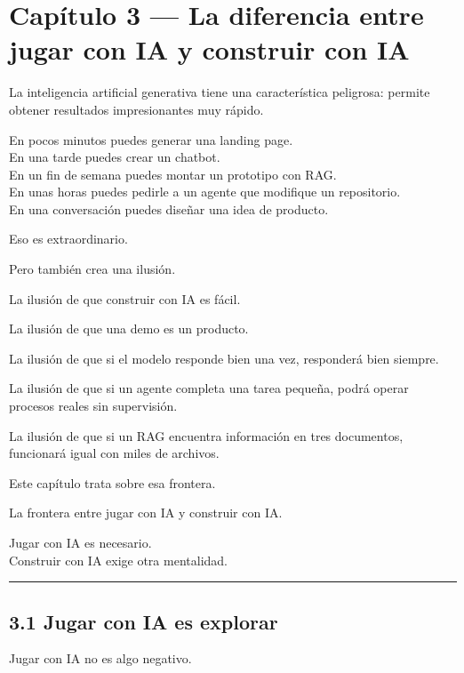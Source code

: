 \newpage

\chapter{Capítulo 3 --- La diferencia entre jugar con IA y construir con
IA}\label{capuxedtulo-3-la-diferencia-entre-jugar-con-ia-y-construir-con-ia}

La inteligencia artificial generativa tiene una característica
peligrosa: permite obtener resultados impresionantes muy rápido.

En pocos minutos puedes generar una landing page.\\
En una tarde puedes crear un chatbot.\\
En un fin de semana puedes montar un prototipo con RAG.\\
En unas horas puedes pedirle a un agente que modifique un repositorio.\\
En una conversación puedes diseñar una idea de producto.

Eso es extraordinario.

Pero también crea una ilusión.

La ilusión de que construir con IA es fácil.

La ilusión de que una demo es un producto.

La ilusión de que si el modelo responde bien una vez, responderá bien
siempre.

La ilusión de que si un agente completa una tarea pequeña, podrá operar
procesos reales sin supervisión.

La ilusión de que si un RAG encuentra información en tres documentos,
funcionará igual con miles de archivos.

Este capítulo trata sobre esa frontera.

La frontera entre jugar con IA y construir con IA.

Jugar con IA es necesario.\\
Construir con IA exige otra mentalidad.

\begin{center}\rule{0.5\linewidth}{0.5pt}\end{center}

\section{3.1 Jugar con IA es explorar}\label{jugar-con-ia-es-explorar}

Jugar con IA no es algo negativo.


